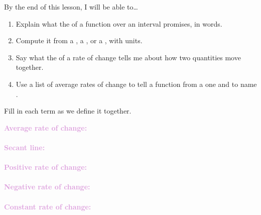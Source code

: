 \documentclass[10pt]{article}
\begin{document}

\vspace{0.12in}

\begin{objectivebox}
By the end of this lesson, I will be able to\ldots
\begin{enumerate}[itemsep=2pt]
  \item Explain what the  of a function over an
        interval promises, in words.
  \item Compute it from a , a , or a
        , with units.
  \item Say what the  of a rate of change tells me about how two
        quantities move together.
  \item Use a list of average rates of change to tell a  function
        from a  one and to name .
\end{enumerate}
\end{objectivebox}

\vspace{0.1in}

\boxguard
\begin{vocabbox}
Fill in each term as we define it together.
\par\vspace{2pt}
\noindent\textbf{\textcolor{plum}{Average rate of change:}}\\[1pt]
\\[3pt]
\noindent\textbf{\textcolor{plum}{Secant line:}}\\[1pt]
\\[3pt]
\noindent\textbf{\textcolor{plum}{Positive rate of change:}}\\[1pt]
\\[3pt]
\noindent\textbf{\textcolor{plum}{Negative rate of change:}}\\[1pt]
\\[3pt]
\noindent\textbf{\textcolor{plum}{Constant rate of change:}}\\[1pt]
\end{vocabbox}
\end{document}
